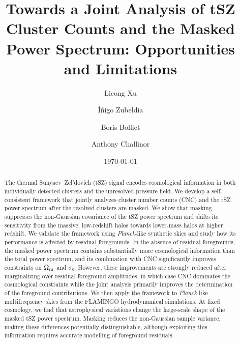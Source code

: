\documentclass[aps,prd,twocolumn,superscriptaddress,nofootinbib,floatfix]{revtex4-2}
\begin{document}
\title{Towards a Joint Analysis of tSZ Cluster Counts and the Masked Power Spectrum: Opportunities and Limitations}

\author{Licong Xu}

\author{Íñigo Zubeldia}

\author{Boris Bolliet}

\author{Anthony Challinor}

\date{\today}

\begin{abstract}
The thermal Sunyaev--Zel'dovich (tSZ) signal encodes cosmological information in both individually detected clusters and the unresolved pressure field. We develop a self-consistent framework that jointly analyzes cluster number counts (CNC) and the tSZ power spectrum after the resolved clusters are masked. We show that masking suppresses the non-Gaussian covariance of the tSZ power spectrum and shifts its sensitivity from the massive, low-redshift halos towards lower-mass halos at higher redshift. We validate the framework using \textit{Planck}-like synthetic skies and study how its performance is affected by residual foregrounds. In the absence of residual foregrounds, the masked power spectrum contains substantially more cosmological information than the total power spectrum, and its combination with CNC significantly improves constraints on $\Omega_{\rm m}$ and $\sigma_8$. However, these improvements are strongly reduced after marginalizing over residual foreground amplitudes, in which case CNC dominates the cosmological constraints while the joint analysis primarily improves the determination of the foreground contributions. We then apply the framework to \textit{Planck}-like multifrequency skies from the FLAMINGO hydrodynamical simulations. At fixed cosmology, we find that astrophysical variations change the large-scale shape of the masked tSZ power spectrum. Masking reduces the non-Gaussian sample variance, making these differences potentially distinguishable, although exploiting this information requires accurate modelling of foreground residuals.
\end{abstract}
\end{document}
